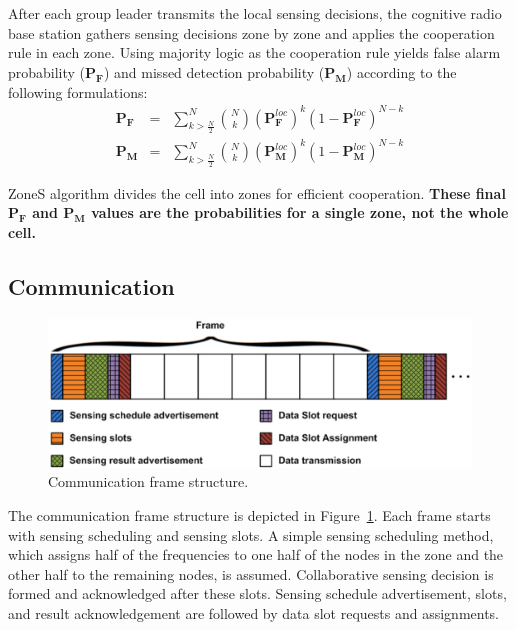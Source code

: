 \documentclass[conference,compsoc]{IEEEtran}
\newcommand{\probf}{\mathbf{P_F}}
\newcommand{\probm}{\mathbf{P_M}}
\newcommand{\probmlocal}{\mathbf{P}_\mathbf{M}^{loc}}
\newcommand{\probflocal}{\mathbf{P}_\mathbf{F}^{loc}}
\newcommand{\CR}{cognitive radio }
\begin{document}
After each group leader transmits the local sensing decisions, the \CR base station gathers sensing decisions zone by zone and applies the cooperation rule in each zone. Using majority logic as the cooperation rule yields false alarm probability ($\probf$) and missed detection probability ($\probm$) according to the following formulations:
\begin{equation}
    \begin{array}{lcl}
        \probf & = & \sum\limits_{ k > \frac{N}{2}}^N {N \choose k}(\probflocal)^k(1-\probflocal)^{N-k} \\
        \probm & = & \sum\limits_{ k > \frac{N}{2}}^N {N \choose k}(\probmlocal)^k(1-\probmlocal)^{N-k}
    \end{array}
\end{equation}

ZoneS algorithm divides the cell into zones for efficient cooperation. \textbf{These final $\probf$ and $\probm$ values are the probabilities for a single zone, not the whole cell.}

\subsection{Communication}
\begin{figure}[!h]
\centering
\includegraphics[width=0.99\columnwidth,keepaspectratio] {figs/frameStructure.eps}
\caption{Communication frame structure.} \label{fig:frame_structure}
\end{figure}
The communication frame structure is depicted in Figure~\ref{fig:frame_structure}. Each frame starts with sensing scheduling and sensing slots. A simple sensing scheduling method, which assigns half of the frequencies to one half of the nodes in the zone and the other half to the remaining nodes, is assumed. Collaborative sensing decision is formed and acknowledged after these slots. Sensing schedule advertisement, slots, and result acknowledgement are followed by data slot requests and assignments.
\end{document}
